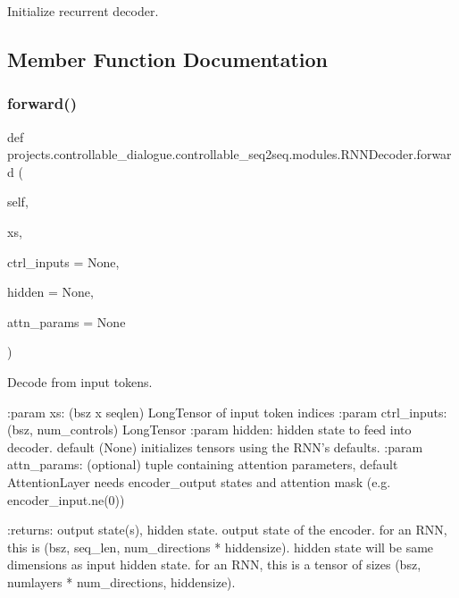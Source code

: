 \begin{DoxyVerb}Initialize recurrent decoder.
\end{DoxyVerb}
 

\subsection{Member Function Documentation}
\mbox{\label{classprojects_1_1controllable__dialogue_1_1controllable__seq2seq_1_1modules_1_1RNNDecoder_acfba6f98c3a1b7a9bd95981a8b5b79a5}} 
\subsubsection{\texorpdfstring{forward()}{forward()}}
{\footnotesize\ttfamily def projects.\+controllable\+\_\+dialogue.\+controllable\+\_\+seq2seq.\+modules.\+R\+N\+N\+Decoder.\+forward (\begin{DoxyParamCaption}\item[{}]{self,  }\item[{}]{xs,  }\item[{}]{ctrl\+\_\+inputs = {\ttfamily None},  }\item[{}]{hidden = {\ttfamily None},  }\item[{}]{attn\+\_\+params = {\ttfamily None} }\end{DoxyParamCaption})}

\begin{DoxyVerb}Decode from input tokens.

:param xs:          (bsz x seqlen) LongTensor of input token indices
:param ctrl_inputs: (bsz, num_controls) LongTensor
:param hidden:      hidden state to feed into decoder. default (None)
            initializes tensors using the RNN's defaults.
:param attn_params: (optional) tuple containing attention parameters,
            default AttentionLayer needs encoder_output states
            and attention mask (e.g. encoder_input.ne(0))

:returns:           output state(s), hidden state.
            output state of the encoder. for an RNN, this is
            (bsz, seq_len, num_directions * hiddensize).
            hidden state will be same dimensions as input
            hidden state. for an RNN, this is a tensor of sizes
            (bsz, numlayers * num_directions, hiddensize).
\end{DoxyVerb}
 

